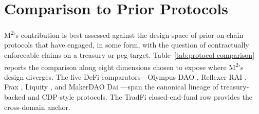 \section{Comparison to Prior Protocols}
\label{sec:comparison}

M\textsuperscript{2}'s contribution is best assessed against the design space of prior on-chain protocols that have engaged, in some form, with the question of contractually enforceable claims on a treasury or peg target. Table~\ref{tab:protocol-comparison} reports the comparison along eight dimensions chosen to expose where M\textsuperscript{2}'s design diverges. The five DeFi comparators---Olympus DAO \citep{OlympusDAO2021}, Reflexer RAI \citep{Reflexer2021}, Frax \citep{Frax2021}, Liquity \citep{Liquity2021}, and MakerDAO Dai \citep{Maker2019}---span the canonical lineage of treasury-backed and CDP-style protocols. The TradFi closed-end-fund row provides the cross-domain anchor.

